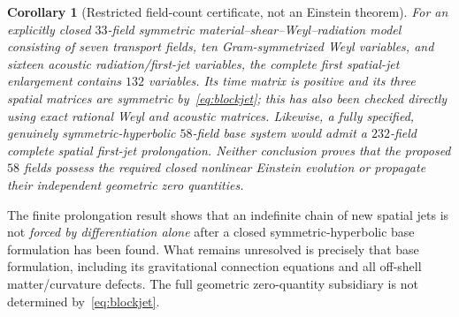 \documentclass[11pt,a4paper]{article}
\newtheorem{corollary}[theorem]{Corollary}
\begin{document}
\begin{corollary}[Restricted field-count certificate, not an Einstein theorem]
For an explicitly closed $33$-field symmetric material--shear--Weyl--radiation \emph{model} consisting of seven transport fields, ten Gram-symmetrized Weyl variables, and sixteen acoustic radiation/first-jet variables, the complete first spatial-jet enlargement contains $132$ variables. Its time matrix is positive and its three spatial matrices are symmetric by~\eqref{eq:blockjet}; this has also been checked directly using exact rational Weyl and acoustic matrices. Likewise, a fully specified, genuinely symmetric-hyperbolic $58$-field base system would admit a $232$-field complete spatial first-jet prolongation. Neither conclusion proves that the proposed $58$ fields possess the required closed nonlinear Einstein evolution or propagate their independent geometric zero quantities.
\end{corollary}

The finite prolongation result shows that an indefinite chain of new spatial jets is not \emph{forced by differentiation alone} after a closed symmetric-hyperbolic base formulation has been found. What remains unresolved is precisely that base formulation, including its gravitational connection equations and all off-shell matter/curvature defects. The full geometric zero-quantity subsidiary is not determined by~\eqref{eq:blockjet}.
\end{document}
